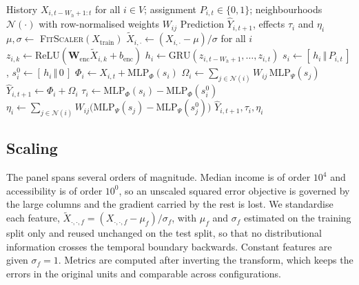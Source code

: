 \documentclass[journal]{IEEEtran}
\newcommand{\CGCEN}{CG\mbox{-}CEN}
\begin{document}
\begin{algorithm}[t]
\caption{\CGCEN{} forward pass with direct and spillover decomposition}
\label{alg:cgcen}
\begin{algorithmic}[1]
\REQUIRE History $X_{i,t-W_h+1:t}$ for all $i \in V$; assignment
         $P_{i,t} \in \{0,1\}$; neighbourhoods $\mathcal{N}(\cdot)$ with
         row-normalised weights $W_{ij}$
\ENSURE  Prediction $\hat{Y}_{i,t+1}$, effects $\tau_i$ and $\eta_i$
\STATE $\mu, \sigma \gets$ \textsc{FitScaler}$(X_{\text{train}})$
\STATE $\tilde{X}_{i,\cdot} \gets (X_{i,\cdot} - \mu) / \sigma$ for all $i$
    \STATE $z_{i,k} \gets \mathrm{ReLU}(\mathbf{W}_{\mathrm{enc}} \tilde{X}_{i,k}
           + b_{\mathrm{enc}})$
\ENDFOR
\STATE $h_i \gets \mathrm{GRU}(z_{i,t-W_h+1}, \dots, z_{i,t})$
\STATE $s_i \gets [\, h_i \,\Vert\, P_{i,t} \,]$, \quad
       $s_i^{0} \gets [\, h_i \,\Vert\, 0 \,]$
\STATE $\Phi_i \gets X_{i,t} + \mathrm{MLP}_{\Phi}(s_i)$
\STATE $\Omega_i \gets \sum_{j \in \mathcal{N}(i)} W_{ij}\,\mathrm{MLP}_{\Psi}(s_j)$
\STATE $\hat{Y}_{i,t+1} \gets \Phi_i + \Omega_i$
\STATE $\tau_i \gets \mathrm{MLP}_{\Phi}(s_i) - \mathrm{MLP}_{\Phi}(s_i^{0})$
\STATE $\eta_i \gets \sum_{j \in \mathcal{N}(i)} W_{ij}
        \big(\mathrm{MLP}_{\Psi}(s_j) - \mathrm{MLP}_{\Psi}(s_j^{0})\big)$
\RETURN $\hat{Y}_{i,t+1}, \tau_i, \eta_i$
\end{algorithmic}
\end{algorithm}

\subsection{Scaling}
\label{subsec:scaling}

The panel spans several orders of magnitude. Median income is of order $10^{4}$
and accessibility is of order $10^{0}$, so an unscaled squared error objective
is governed by the large columns and the gradient carried by the rest is lost.
We standardise each feature, $\tilde{X}_{\cdot,\cdot,f} =
(X_{\cdot,\cdot,f} - \mu_f)/\sigma_f$, with $\mu_f$ and $\sigma_f$ estimated on
the training split only and reused unchanged on the test split, so that no
distributional information crosses the temporal boundary backwards. Constant
features are given $\sigma_f = 1$. Metrics are computed after inverting the
transform, which keeps the errors in the original units and comparable across
configurations.
\end{document}
